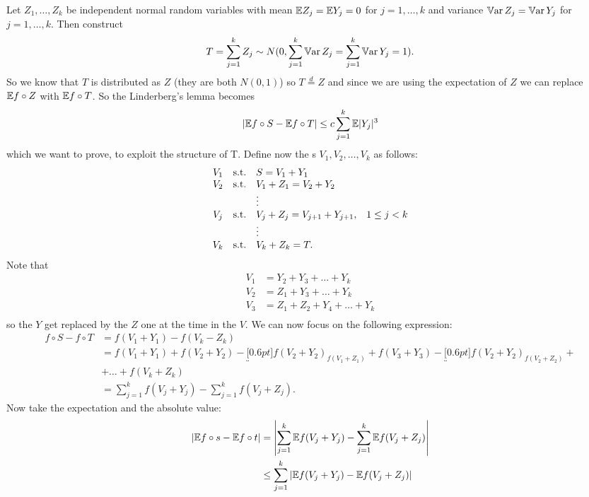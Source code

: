 \documentclass{report}
\begin{document}
\begin{fancyproof}
	Let $Z_1,\ldots,Z_k$ be independent normal random variables with mean $\mathbb{E} Z_{j}=\mathbb{E} Y_{j}=0$ for $j=1,\ldots,k$ and variance $\mathbb{V}\mathrm{ar}\, Z_{j}=\mathbb{V}\mathrm{ar}\, Y_{j}$ for $j=1,\ldots,k$. Then construct
	\[T=\sum_{j=1}^{k}Z_j\sim N(0,\sum_{j=1}^{k}\mathbb{V}\mathrm{ar}\, Z_{j}=\sum_{j=1}^{k}\mathbb{V}\mathrm{ar}\, Y_{j}=1).\]
	So we know that $T$ is distributed as $Z$ (they are both $N(0,1)$) so $T\stackrel{d}{=}Z$ and since we are using the expectation of $Z$ we can replace $\mathbb{E} f\circ Z$ with $\mathbb{E} f\circ T$. So the Linderberg's lemma becomes
	\[|\mathbb{E} f\circ S-\mathbb{E} f\circ T|\leq c\sum_{j=1}^{k}\mathbb{E}|Y_{j}|^{3}\]
	which we want to prove, to exploit the structure of T. Define now the \rv s $V_1,V_2,\ldots,V_k$ as follows:
	\[\begin{array}{c c l c}
		V_1&\text{s.t.}&S=V_1+Y_1\\
		V_2&\text{s.t.}&V_1+Z_1=V_2+Y_2\\
		&&\vdots\\
		V_j&\text{s.t.}&V_j+Z_j=V_{j+1}+Y_{j+1},&1\leq j<k\\
		&&\vdots\\
		V_k&\text{s.t.}&V_{k}+Z_{k}=T.\\
	\end{array}\]
	Note that 
	\begin{align*}
		V_{1}&=Y_{2}+Y_{3}+\ldots+Y_{k}\\
		V_{2}&=Z_1+Y_{3}+\ldots+Y_{k}\\
		V_{3}&=Z_1+Z_{2}+Y_{4}+\ldots+Y_{k}\\
	\end{align*}
	so the $Y$ get replaced by the $Z$ one at the time in the $V$. We can now focus on the following expression:
	\begin{align*}
		f\circ S-f\circ T&=f(V_1+Y_1)-f(V_{k}-Z_{k})\\
		&=f(V_{1}+Y_{1})+f(V_{2}+Y_{2})-\underbracket[0.6pt]{f(V_{2}+Y_{2})}_{f(V_1+Z_1)}+f(V_{3}+Y_{3})-\underbracket[0.6pt]{f(V_{2}+Y_{2})}_{f(V_2+Z_2)}+\\
		&+\ldots+f(V_{k}+Z_{k})\\
		&=\sum_{j=1}^{k}f(V_{j}+Y_{j})-\sum_{j=1}^{k}f(V_j+Z_j).
	\end{align*}
	Now take the expectation and the absolute value:
	\begin{align*}
		|\mathbb{E} f\circ s-\mathbb{E} f\circ t|&=\left|\sum_{j=1}^{k}\mathbb{E} f(V_{j}+Y_{j})-\sum_{j=1}^{k}\mathbb{E} f(V_j+Z_j)\right|\\
		&\leq\sum_{j=1}^{k}\left|\mathbb{E} f(V_{j}+Y_{j})-\mathbb{E} f(V_j+Z_j)\right|
	\end{align*}

\end{fancyproof}
\end{document}
